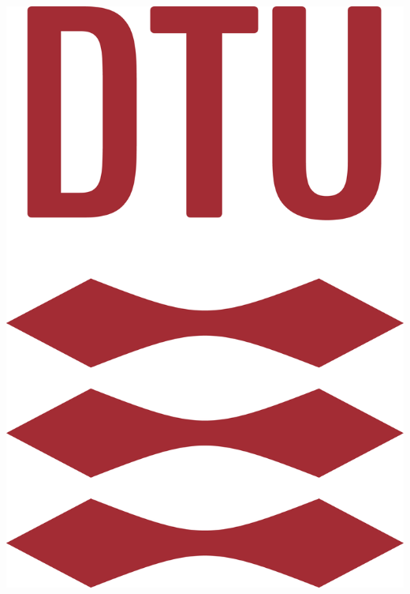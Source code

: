 \begin{titlepage} %
	\newcommand{\HRule}{\rule{\linewidth}{0.5mm}} %
	
	\center %
	   
	

    \includegraphics[scale=0.07]{Billeder/DTULogo.png}\\[0.5cm]


\end{titlepage}
